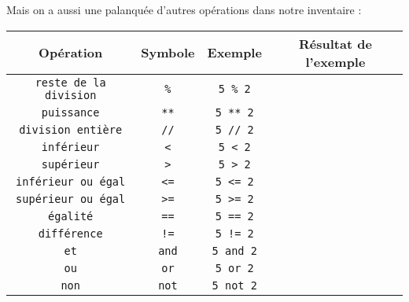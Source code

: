 \documentclass[12pt,a4paper, oneside]{article}
\theoremstyle{definition}
\begin{document}
      Mais on a aussi une palanquée d'autres opérations dans notre inventaire :
      \begin{center}
      \begin{tabular}{|c|c|c|c|}
        \hline
        \textbf{Opération} & \textbf{Symbole} & \textbf{Exemple} & \textbf{Résultat de l'exemple} \\
        \hline
         \texttt{reste de la division} & \texttt{\%} & \texttt{5 \% 2} & \\
        \hline
         \texttt{puissance} & \texttt{**} & \texttt{5 ** 2} & \\
        \hline
         \texttt{division entière} & \texttt{//} & \texttt{5 // 2} & \\
        \hline
         \texttt{inférieur} & \texttt{<} & \texttt{5 < 2} & \\
        \hline
         \texttt{supérieur} & \texttt{>} & \texttt{5 > 2} & \\
        \hline
         \texttt{inférieur ou égal} & \texttt{<=} & \texttt{5 <= 2} & \\
        \hline
         \texttt{supérieur ou égal} & \texttt{>=} & \texttt{5 >= 2} & \\
        \hline
         \texttt{égalité} & \texttt{==} & \texttt{5 == 2} & \\
        \hline
         \texttt{différence} & \texttt{!=} & \texttt{5 != 2} & \\
        \hline
         \texttt{et} & \texttt{and} & \texttt{5 and 2} & \\
        \hline
         \texttt{ou} & \texttt{or} & \texttt{5 or 2} & \\
        \hline
         \texttt{non} & \texttt{not} & \texttt{5 not 2} & \\
        \hline
      \end{tabular}
      \end{center}
\end{document}
